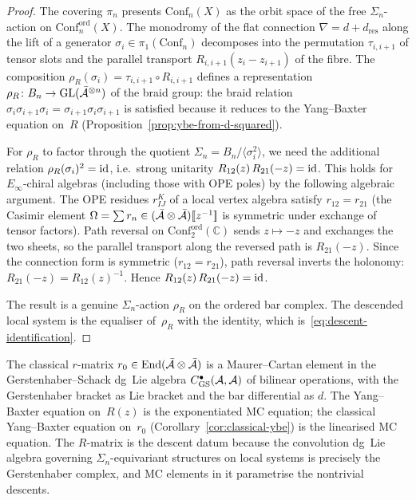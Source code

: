 \begin{proof}
The covering $\pi_n$ presents $\mathrm{Conf}_n(X)$ as the
orbit space of the free $\Sigma_n$-action on
$\mathrm{Conf}_n^{\mathrm{ord}}(X)$. The monodromy of the
flat connection $\nabla=d+d_{\mathrm{res}}$ along the lift of a
generator $\sigma_i\in\pi_1(\mathrm{Conf}_n)$ decomposes into
the permutation $\tau_{i,i+1}$ of tensor slots and the
parallel transport $R_{i,i+1}(z_i-z_{i+1})$ of the fibre.
The composition
$\rho_R(\sigma_i)=\tau_{i,i+1}\circ R_{i,i+1}$ defines a
representation $\rho_R\colon B_n\to\operatorname{GL}(\bar{\mathcal{A}}^{\otimes n})$
of the braid group: the braid relation
$\sigma_i\sigma_{i+1}\sigma_i
=\sigma_{i+1}\sigma_i\sigma_{i+1}$ is satisfied because it
reduces to the Yang--Baxter equation on~$R$
(Proposition~\ref{prop:ybe-from-d-squared}).

For $\rho_R$ to factor through the quotient
$\Sigma_n=B_n/\langle\sigma_i^2\rangle$, we need the
additional relation $\rho_R(\sigma_i)^2=\mathrm{id}$, i.e.\
strong unitarity $R_{12}(z)\,R_{21}(-z)=\mathrm{id}$. This holds
for $E_\infty$-chiral algebras (including those with OPE
poles) by the following algebraic argument. The OPE
residues $r_{IJ}^K$ of a local vertex algebra satisfy
$r_{12}=r_{21}$ (the Casimir element
$\Omega=\sum r_n\in(\bar{\mathcal{A}}\otimes\bar{\mathcal{A}})[\![z^{-1}]\!]$
is symmetric under exchange of tensor factors). Path
reversal on $\mathrm{Conf}_2^{\mathrm{ord}}(\mathbb C)$ sends
$z\mapsto -z$ and exchanges the two sheets, so the parallel
transport along the reversed path is $R_{21}(-z)$. Since the
connection form is symmetric ($r_{12}=r_{21}$), path reversal
inverts the holonomy: $R_{21}(-z)=R_{12}(z)^{-1}$.
Hence $R_{12}(z)\,R_{21}(-z)=\mathrm{id}$.

The result is a genuine $\Sigma_n$-action $\rho_R$ on the
ordered bar complex. The descended local system is the
equaliser of~$\rho_R$ with the identity,
which is~\eqref{eq:descent-identification}.
\end{proof}

\begin{remark}
\label{rem:r-matrix-mc}
The classical $r$-matrix
$r_0\in\operatorname{End}(\bar{\mathcal{A}}\otimes\bar{\mathcal{A}})$ is a
Maurer--Cartan element in the Gerstenhaber--Schack dg~Lie
algebra $C^\bullet_{\mathrm{GS}}(\mathcal{A},\mathcal{A})$ of bilinear
operations, with the Gerstenhaber bracket as Lie bracket
and the bar differential as $d$. The Yang--Baxter equation
on~$R(z)$ is the exponentiated MC equation; the
classical Yang--Baxter equation on~$r_0$
(Corollary~\ref{cor:classical-ybe}) is the linearised MC
equation. The $R$-matrix is the descent datum because the
convolution dg~Lie algebra governing $\Sigma_n$-equivariant
structures on local systems is precisely the Gerstenhaber
complex, and MC elements in it parametrise the nontrivial
descents.
\end{remark}

